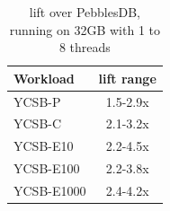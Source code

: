 \begin{table}
\centering
{\small{
\begin{tabular}{|l|c|}
\hline 
Workload & lift range \\
\hline 
YCSB-P & 1.5-2.9x \\
YCSB-C & 2.1-3.2x\\
YCSB-E10 & 2.2-4.5x \\
YCSB-E100 & 2.2-3.8x \\
YCSB-E1000 & 2.4-4.2x \\
\hline 
\end{tabular}
}}
\caption{{\sys\/ lift over PebblesDB, running on 32GB with 1 to 8 threads}}
\label{fig:pebbels-throughput}
\end{table}




  